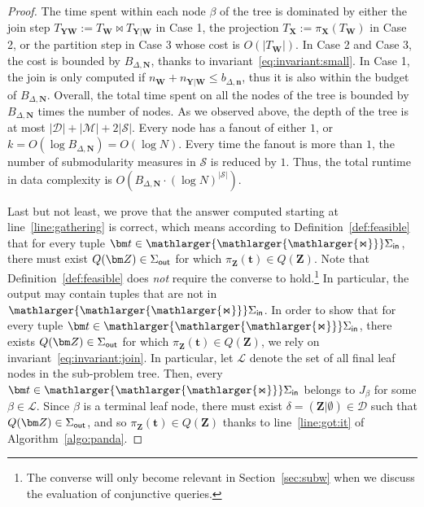 \documentclass[10pt,a4paper]{article}
\newcommand{\calM}{\mathcal M}
\newcommand{\calS}{\mathcal S}
\newcommand{\calD}{\mathcal D}
\newcommand{\calL}{\mathcal L}
\newcommand{\bigjoin}{\mathlarger{\mathlarger{\mathlarger{\Join}}}}
\newcommand{\inn}{\text{\sf in}}
\newcommand{\out}{\text{\sf out}}
\begin{document}
\begin{proof}
  The time spent within each node $\beta$ of the tree is dominated by either
  the join step $T_{\bm Y\bm W}:=T_{\bm W}\Join T_{\bm Y | \bm W}$ in Case 1,
  the projection $T_{\bm X} := \pi_{\bm X}(T_{\bm W})$ in Case 2,
  or the partition step in Case 3 whose cost is $O(|T_{\bm W}|)$.
  In Case 2 and Case 3, the cost is bounded by $B_{\Delta,\bm N}$, thanks to
  invariant~\eqref{eq:invariant:small}.
  In Case 1, the join is only computed if $n_{\bm W}+n_{\bm Y | \bm W}\leq b_{\Delta,\bm n}$,
  thus it is also within the budget of $B_{\Delta,\bm N}$.
  Overall, the total time spent on all the nodes of the tree is bounded by $B_{\Delta,\bm N}$
  times the number of nodes. As we observed above, the depth of the tree is at most
  $|\calD|+|\calM|+2|\calS|$. Every node has a fanout of either $1$, or
  $k = O(\log B_{\Delta,\bm N}) = O(\log N)$.
  Every time the fanout is more than $1$, the number of submodularity measures in
  $\calS$ is reduced by $1$. Thus, the total runtime in data complexity is
  $O(B_{\Delta, \bm N} \cdot (\log N)^{|\calS|})$.

  Last but not least, we prove that the answer computed starting at line~\ref{line:gathering}
  is correct, which means according to Definition~\ref{def:feasible} that for every tuple $\bm t \in \bigjoin \Sigma_\inn$, there must
  exist $Q(\bm Z) \in \Sigma_\out$ for which $\pi_{\bm Z}(\bm t) \in Q(\bm Z)$.
  Note that Definition~\ref{def:feasible} does {\em not} require the converse to hold.\footnote{The converse will only become relevant in Section~\ref{sec:subw} when we discuss the evaluation of conjunctive queries.}
  In particular, the output may contain tuples that are not in $\bigjoin \Sigma_\inn$.
  In order to show that for every tuple $\bm t \in \bigjoin \Sigma_\inn$, there
  exists $Q(\bm Z) \in \Sigma_\out$ for which $\pi_{\bm Z}(\bm t) \in Q(\bm Z)$,
  we rely on invariant~\eqref{eq:invariant:join}.
  In particular, let $\calL$ denote the set of all final leaf nodes in the sub-problem tree.
  Then, every $\bm t \in \bigjoin\Sigma_\inn$ belongs to $J_\beta$ for some $\beta \in \calL$.
  Since $\beta$ is a terminal leaf node, there must exist $\delta = (\bm Z|\emptyset) \in \calD$
  such that $Q(\bm Z) \in \Sigma_\out$, and so $\pi_{\bm Z}(\bm t) \in Q(\bm Z)$
  thanks to line~\ref{line:got:it} of Algorithm~\ref{algo:panda}.
\end{proof}
\end{document}
